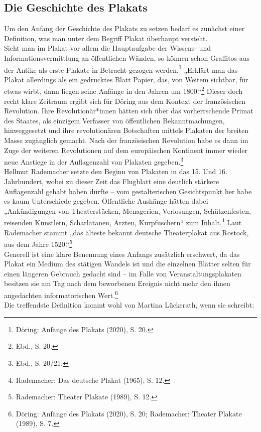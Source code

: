 \documentclass[a4paper,12pt,ngerman]{article}
\begin{document}
\subsection{Die Geschichte des Plakats}
Um den Anfang der Geschichte des Plakats zu setzen bedarf es zunächst einer Definition, was man unter dem Begriff Plakat überhaupt versteht. \\
Sieht man im Plakat vor allem die Hauptaufgabe der Wissens- und Informationsvermittlung an öffentlichen Wänden, so können schon Graffitos aus der Antike als erste Plakate in Betracht gezogen werden.\footnote{Döring: Anfänge des Plakats (2020), S. 20.}  „Erklärt man das Plakat allerdings als ein gedrucktes Blatt Papier, das, von Weitem sichtbar, für etwas wirbt, dann liegen seine Anfänge in den Jahren um 1800.“\footnote{Ebd., S. 20.}  Dieser doch recht klare Zeitraum ergibt sich für Döring aus dem Kontext der französischen Revolution. Ihre Revolutionär*innen hätten sich über das vorherrschende Primat des Staates, als einzigem Verfasser von öffentlichen Bekanntmachungen, hinweggesetzt und ihre revolutionären Botschaften mittels Plakaten der breiten Masse zugänglich gemacht. Nach der französischen Revolution habe es dann im Zuge der weiteren Revolutionen auf dem europäischen Kontinent immer wieder neue Anstiege in der Auflagenzahl von Plakaten gegeben.\footnote{Ebd., S. 20/21.} \\
Hellmut Rademacher setzte den Beginn von Plakaten in das 15. Und 16. Jahrhundert, wobei zu dieser Zeit das Flugblatt eine deutlich stärkere Auflagenzahl gehabt haben dürfte – vom gestalterischen Gesichtspunkt her habe es kaum Unterschiede gegeben. Öffentliche Aushänge hätten dabei „Ankündigungen von Theaterstücken, Menagerien, Verlosungen, Schützenfesten, reisenden Künstlern, Scharlatanen, Ärzten, Kurpfuschern“ zum Inhalt.\footnote{Rademacher: Das deutsche Plakat (1965), S. 12.}  Laut Rademacher stammt „das älteste bekannt deutsche Theaterplakat aus Rostock, aus dem Jahre 1520.“\footnote{Rademacher: Theater Plakate (1989), S. 12.} \\
Generell ist eine klare Benennung eines Anfangs zusätzlich erschwert, da das Plakat ein Medium des stätigen Wandels ist und die einzelnen Blätter selten für einen längeren Gebrauch gedacht sind – im Falle von Veranstaltungsplakaten besitzen sie am Tag nach dem beworbenen Ereignis nicht mehr den ihnen angedachten informatorischen Wert.\footnote{Döring: Anfänge des Plakats (2020), S. 20; Rademacher: Theater Plakate (1989), S. 7.} \\
Die treffendste Definition kommt wohl von Martina Lückerath, wenn sie schreibt:
\end{document}
